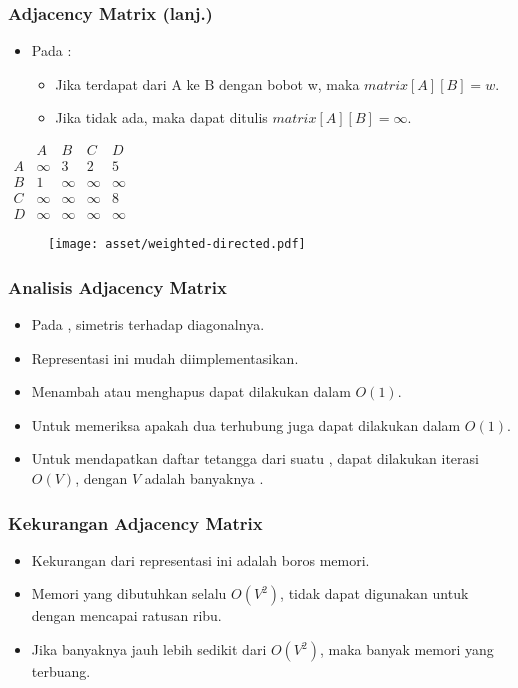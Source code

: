 \begin{frame}
\frametitle{Adjacency Matrix (lanj.)}
\begin{itemize}
  \item Pada  \fgraph:
  \begin{itemize}
    \item Jika terdapat \fedge dari A ke B dengan bobot w, maka $matrix[A][B] = w$. 
    \item Jika tidak ada, maka dapat ditulis $matrix[A][B] = \infty$.
  \end{itemize}
\end{itemize}

\begin{center}
\begin{multicols}{2}
  $\begin{array}{c|cccc}
      & A & B & C & D \\ \hline
    A & \infty & 3 & 2 & 5 \\
    B & 1 & \infty & \infty & \infty \\
    C & \infty & \infty & \infty & 8 \\
    D & \infty & \infty & \infty & \infty
  \end{array}$
  \break
  \begin{figure}
    \texttt{[image: asset/weighted-directed.pdf]}
  \end{figure}
\end{multicols} 
\end{center}
\end{frame}

\begin{frame}
\frametitle{Analisis Adjacency Matrix}
\begin{itemize}
  \item Pada  \fgraph, \fadjacencymatrix simetris terhadap diagonalnya.
  \item Representasi ini mudah diimplementasikan.
  \item Menambah atau menghapus \fedge dapat dilakukan dalam $O(1)$.
  \item Untuk memeriksa apakah dua \fnode terhubung juga dapat dilakukan dalam $O(1)$.
  \item Untuk mendapatkan daftar tetangga dari suatu \fnode, dapat dilakukan iterasi $O(V)$, dengan $V$ adalah banyaknya \fnode.
\end{itemize}
\end{frame}

\begin{frame}
\frametitle{Kekurangan Adjacency Matrix}
\begin{itemize}
  \item Kekurangan dari representasi ini adalah boros memori.
  \item Memori yang dibutuhkan selalu $O(V^2)$, tidak dapat digunakan untuk \fgraph dengan \fnode mencapai ratusan ribu.
  \item Jika banyaknya \fedge jauh lebih sedikit dari $O(V^2)$, maka banyak memori yang terbuang.
\end{itemize}
\end{frame}

